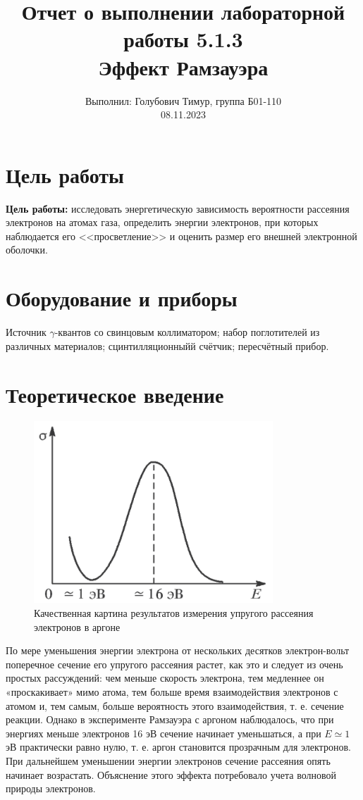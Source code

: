 \documentclass[12pt,a4paper]{article}
\author{\normalsize Выполнил: Голубович Тимур, группа Б01-110 \\
    	\normalsize 08.11.2023}
\date{}
\title{
    	\large Отчет о выполнении лабораторной работы 5.1.3 \\
    	\Large Эффект Рамзауэра
     }
\begin{document}
\maketitle

\section*{Цель работы}

\textbf{Цель работы:} исследовать энергетическую зависимость вероятности рассеяния электронов на атомах газа, определить энергии электронов, при которых наблюдается его <<просветление>> и оценить размер его внешней электронной оболочки.

\section*{Оборудование и приборы}

Источник  $\gamma$-квантов со свинцовым коллиматором; набор поглотителей из различных материалов; сцинтилляционныйй счётчик; пересчётный прибор.
	
\section*{Теоретическое введение}

\begin{figure}
		\includegraphics[width=0.8\textwidth]{res/2.png}
		\caption{Качественная картина результатов измерения упругого рассеяния электронов в аргоне}
	\end{figure}


	По мере уменьшения энергии электрона от нескольких десятков электрон-вольт поперечное сечение его упругого рассеяния растет, как это и следует из очень простых рассуждений: чем меньше скорость электрона, тем медленнее он «проскакивает» мимо атома, тем больше время взаимодействия электронов с атомом и, тем самым, больше вероятность этого взаимодействия, т. е. сечение реакции. Однако в эксперименте Рамзауэра с аргоном наблюдалось, что при энергиях меньше электронов 16 эВ сечение начинает уменьшаться, а при $E \simeq 1$ эВ практически равно нулю, т. е. аргон становится прозрачным для электронов. При дальнейшем уменьшении энергии электронов сечение рассеяния опять начинает возрастать. Объяснение этого эффекта потребовало учета волновой природы электронов.
	
\end{document}
